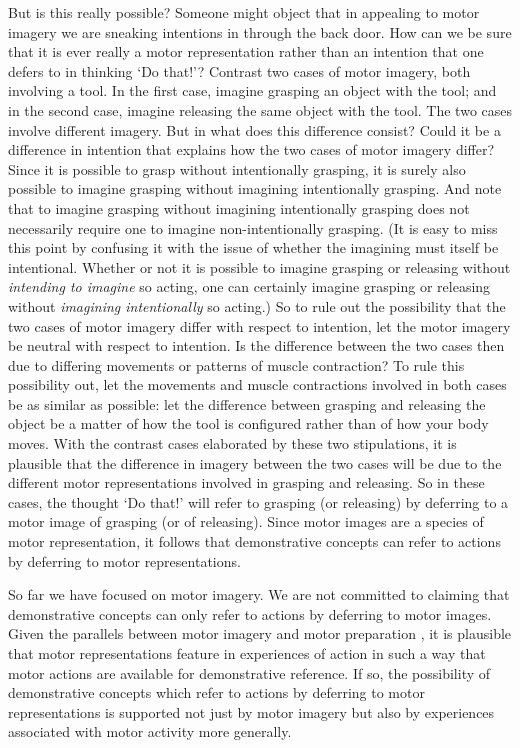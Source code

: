 \documentclass[12pt,\papersize]{extarticle}
\begin{document}
But is this really possible? Someone might object that in appealing to motor imagery we are sneaking intentions in through the back door. How can we be sure that it is ever really a motor representation rather than an intention that one defers to in thinking `Do that!'?  Contrast two cases of motor imagery, both involving a tool. In the first case, imagine grasping an object with the tool; and in the second case, imagine releasing the same object with the tool. The two cases involve different imagery. But in what does this difference consist? Could it be a difference in intention that explains how the two cases of motor imagery differ?  Since it is possible to grasp without intentionally grasping, it is surely also possible to imagine grasping without imagining intentionally grasping.  And note that to imagine grasping without imagining intentionally grasping does not necessarily require one to imagine non-intentionally grasping. (It is easy to miss this point by confusing it with the issue of whether the imagining must itself be intentional. Whether or not it is possible to imagine grasping or releasing without \emph{intending to imagine} so acting, one can certainly imagine grasping or releasing without \emph{imagining intentionally} so acting.) So to rule out the possibility that the two cases of motor imagery differ with respect to intention, let the motor imagery be neutral with respect to intention. Is the difference between the two cases then due to differing movements or patterns of muscle contraction? To rule this possibility out, let the movements and muscle contractions involved in both cases be as similar as possible: let the difference between grasping and releasing the object be a matter of how the tool is configured rather than of how your body moves. With the contrast cases elaborated by these two stipulations, it is plausible that the difference in imagery between the two cases will be due to the different motor representations involved in grasping and releasing. So in these cases, the thought `Do that!' will refer to grasping (or releasing) by deferring to a motor image of grasping (or of releasing). Since motor images are a species of motor representation, it follows that demonstrative concepts can refer to actions by deferring to motor representations.

So far we have focused on motor imagery. We are not committed to claiming that demonstrative concepts can only refer to actions by deferring to motor images. Given the parallels between motor imagery and motor preparation \citep{Jeannerod:2001yb}, it is plausible that motor representations feature in experiences of action in such a way that motor actions are available for demonstrative reference. If so, the possibility of demonstrative concepts which refer to actions by deferring to motor representations is supported not just by motor imagery but also by experiences associated with motor activity more generally.
\end{document}
